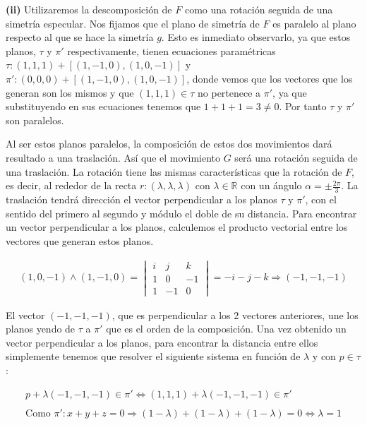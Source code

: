 \hspace*{10mm} \textbf{(ii)} Utilizaremos la descomposición de $F$ como una rotación seguida de una simetría especular. Nos fijamos que el plano de simetría de $F$ es paralelo al plano respecto al que se hace la simetría $g$. Esto es inmediato observarlo, ya que estos planos, $\tau$ y $\pi'$ respectivamente, tienen ecuaciones paramétricas $\tau: (1,1,1) + [(1,-1,0),(1,0,-1)]$ y $\pi': (0,0,0)+ [(1,-1,0),(1,0,-1)]$, donde vemos que los vectores que los generan son los mismos y que $(1,1,1) \in \tau$ no pertenece a $\pi'$, ya que substituyendo en sus ecuaciones tenemos que $1+1+1=3\neq 0$. Por tanto $\tau$ y $\pi'$ son paralelos.

Al ser estos planos paralelos, la composición de estos dos movimientos dará resultado a una traslación. Así que el movimiento $G$ será una rotación seguida de una traslación. La rotación tiene las mismas características que la rotación de $F$, es decir, al rededor de la recta $r: (\lambda, \lambda, \lambda)$ con $\lambda \in \mathbb{R}$ con un ángulo $\alpha = \pm \frac{2\pi}{3}$. La traslación tendrá dirección el vector perpendicular a los planos $\tau$ y $\pi'$, con el sentido del primero al segundo y módulo el doble de su distancia. Para encontrar un vector perpendicular a los planos, calculemos el producto vectorial entre los vectores que generan estos planos.

\begin{gather*}
    (1,0,-1)\wedge(1,-1,0) = \begin{vmatrix} i & j & k\\ 1 & 0 & -1\\ 1&-1&0 \end{vmatrix} = -i-j-k \Longrightarrow (-1,-1,-1)
\end{gather*}

El vector $(-1,-1,-1)$, que es perpendicular a los 2 vectores anteriores, une los planos yendo de $\tau$ a $\pi'$ que es el orden de la composición. Una vez obtenido un vector perpendicular a los planos, para encontrar la distancia entre ellos simplemente tenemos que resolver el siguiente sistema en función de $\lambda$ y con $p\in\tau$:

\begin{gather*}
    p + \lambda(-1,-1,-1)\in \pi' \Longleftrightarrow
    (1,1,1) +\lambda(-1,-1,-1)\in \pi'\\
    \\
    \text{Como }\pi': x+y+z=0 \Longrightarrow (1-\lambda) + (1-\lambda) + (1-\lambda) = 0 \Longleftrightarrow\lambda = 1
\end{gather*}

